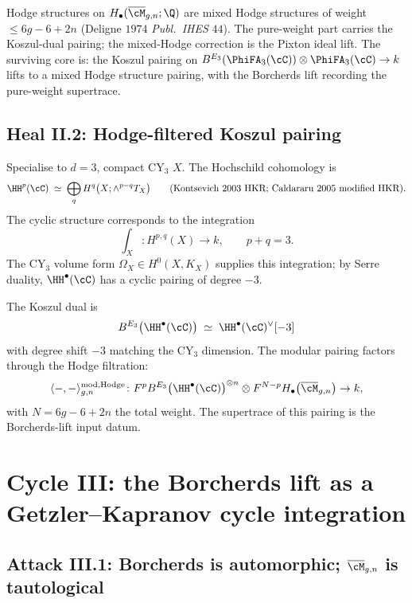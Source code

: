 Hodge structures on $H_\bullet(\overline{\cM}_{g, n}; \Q)$ are mixed
Hodge structures of weight $\leq 6g - 6 + 2n$ (Deligne $1974$
\emph{Publ.~IHES} $44$). The pure-weight part carries the Koszul-dual
pairing; the mixed-Hodge correction is the Pixton ideal lift. The
surviving core is: the Koszul pairing on
$B^{E_3}(\PhiFA_3(\cC)) \otimes \PhiFA_3(\cC) \to k$ lifts to a mixed
Hodge structure pairing, with the Borcherds lift recording the
pure-weight supertrace.

\subsection*{Heal II.2: Hodge-filtered Koszul pairing}

Specialise to $d = 3$, compact CY$_3$ $X$. The Hochschild cohomology
is
\[
 \HH^p(\cC) \;\simeq\; \bigoplus_{q} H^q\bigl(X; \wedge^{p - q} T_X\bigr)
 \qquad \text{(Kontsevich $2003$ HKR; Caldararu $2005$ modified
 HKR)}.
\]
The cyclic structure corresponds to the integration
\[
 \int_X \colon H^{p, q}(X) \to k, \qquad p + q = 3.
\]
The CY$_3$ volume form $\Omega_X \in H^0(X, K_X)$ supplies this
integration; by Serre duality, $\HH^\bullet(\cC)$ has a cyclic pairing
of degree $-3$.

The Koszul dual is
\[
 B^{E_3}\bigl(\HH^\bullet(\cC)\bigr) \;\simeq\;
 \HH^\bullet(\cC)^{\vee}[-3]
\]
with degree shift $-3$ matching the CY$_3$ dimension. The modular
pairing factors through the Hodge filtration:
\begin{equation}
\label{eq:hodge-koszul-pairing}
 \langle -, - \rangle^{\mathrm{mod, Hodge}}_{g, n} \colon
 F^p B^{E_3}\bigl(\HH^\bullet(\cC)\bigr)^{\otimes n} \otimes
 F^{N - p} H_\bullet\bigl(\overline{\cM}_{g, n}\bigr) \to k,
\end{equation}
with $N = 6g - 6 + 2n$ the total weight. The supertrace of this pairing
is the Borcherds-lift input datum.


\section{Cycle III: the Borcherds lift as a Getzler--Kapranov cycle
integration}
\label{sec:cycle-3-borcherds-as-gk-integration}

\subsection*{Attack III.1: Borcherds is automorphic; $\overline{\cM}_{g, n}$
is tautological}

